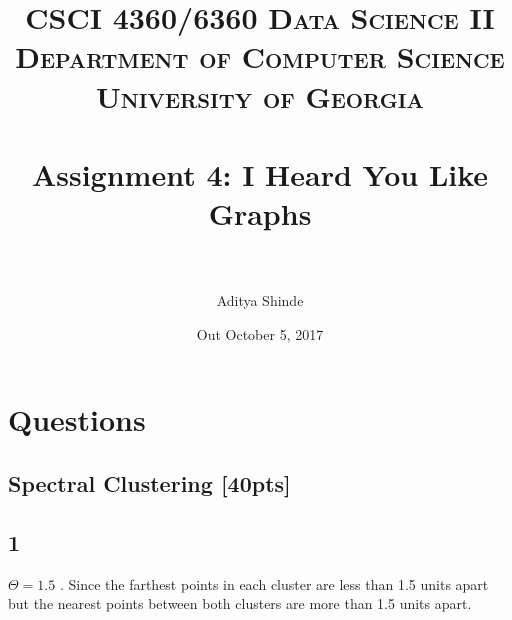 \documentclass[paper=a4, fontsize=11pt]{scrartcl} %
\title{	
\normalfont \normalsize 
\textsc{CSCI 4360/6360 Data Science II} \\
\textsc{Department of Computer Science} \\
\textsc{University of Georgia} \\ [15pt] %
\horrule{0.5pt} \\[0.3cm] %
\huge Assignment 4: I Heard You Like Graphs \\ %
\horrule{2pt} \\[0.4cm] %
}
\author{Aditya Shinde} %
\date{\normalsize Out October 5, 2017}
\numberwithin{figure}{section} %
\numberwithin{table}{section} %
\begin{document}
\maketitle %


\section*{Questions}

\setcounter{subsection}{0}

\subsection{Spectral Clustering \textbf{[40pts]}}

\subsection*{1}
$\Theta = 1.5$ . Since the farthest points in each cluster are less than 1.5 units apart but the nearest points between both clusters are more than 1.5 units apart. \\
\end{document}
